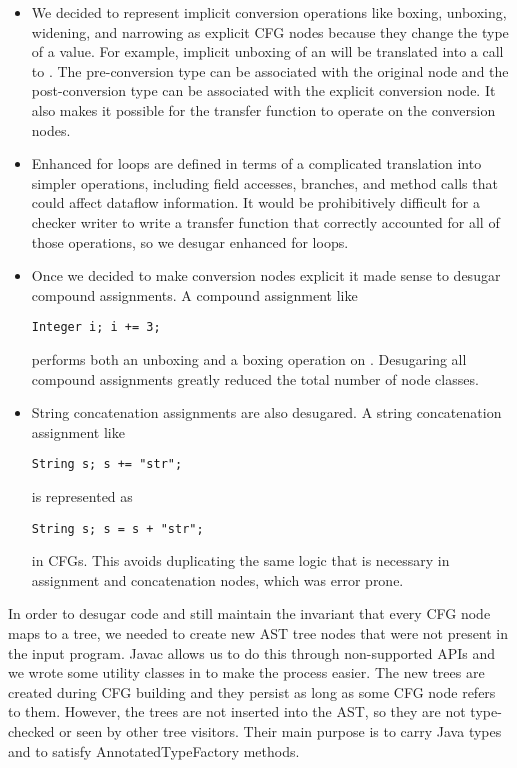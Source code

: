     \begin{itemize}
    \item We decided to represent implicit conversion operations like
      boxing, unboxing, widening, and narrowing as explicit CFG nodes
      because they change the type of a value.  For example, implicit
      unboxing of an  will be translated into a call to
      .  The pre-conversion type can be
      associated with the original node and the post-conversion type
      can be associated with the explicit conversion node.  It also
      makes it possible for the transfer function to operate on the
      conversion nodes.

    \item Enhanced for loops are defined in terms of a complicated
      translation into simpler operations, including field accesses,
      branches, and method calls that could affect dataflow
      information.  It would be prohibitively difficult for a checker
      writer to write a transfer function that correctly accounted for
      all of those operations, so we desugar enhanced for loops.

    \item Once we decided to make conversion nodes explicit it made
      sense to desugar compound assignments.  A compound assignment
      like \begin{verbatim}Integer i; i += 3;\end{verbatim} performs
      both an unboxing and a boxing operation on .  Desugaring
      all compound assignments greatly reduced the total number of
      node classes.

    \item String concatenation assignments are also desugared. A string
      concatenation assignment like
      \begin{verbatim}String s; s += "str";\end{verbatim} is represented as
      \begin{verbatim}String s; s = s + "str";\end{verbatim} in CFGs.
      This avoids duplicating the same logic that is necessary in assignment
      and concatenation nodes, which was error prone.

    \end{itemize}

In order to desugar code and still maintain the invariant that every
CFG node maps to a tree, we needed to create new AST tree nodes that
were not present in the input program.  Javac allows us to do this
through non-supported APIs and we wrote some utility classes in
 to make the process easier.  The new trees are
created during CFG building and they persist as long as some CFG node
refers to them.  However, the trees are not inserted into the AST, so
they are not type-checked or seen by other tree visitors.  Their main
purpose is to carry Java types and to satisfy AnnotatedTypeFactory
methods.

